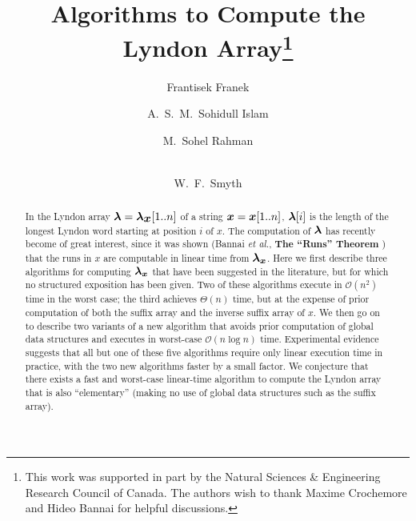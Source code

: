 \documentclass[10pt]{llncs}
\def\s#1{\mbox{\boldmath $#1$}}
\def\O{\mathcal{O}}
\begin{document}
\pagestyle{headings}
\title{Algorithms to Compute the Lyndon Array\thanks
{This work was supported in part by the
Natural Sciences \& Engineering Research Council of Canada.
The authors wish to thank Maxime Crochemore and Hideo Bannai
for helpful discussions.}
}
\author{Frantisek Franek
\and
A.\ S.\ M.\ Sohidull Islam
\and M.\ Sohel Rahman
\and \\ 
W.\ F.\ Smyth
}

\maketitle

\begin{abstract}
In the Lyndon array $\s{\s{\lambda}} = \s{\s{\lambda}}_{\s{x}}[1..n]$ of a string $\s{x} = \s{x}[1..n]$,
$\s{\lambda}[i]$ is the length of the longest Lyndon word starting at
position $i$ of \s{x}.
The computation of $\s{\lambda}$ has recently become of
great interest, since it was shown
(Bannai {\it et al.}, {\bf The ``Runs'' Theorem} \cite{BIINTT14})
that the runs in \s{x} are computable in linear time
from $\s{\lambda_x}$.
Here we first describe three algorithms for computing $\s{\lambda_x}$
that have been suggested in the literature,
but for which no structured exposition has been given.
Two of these algorithms execute in $\O(n^2)$ time in the worst case;
the third achieves $\Theta(n)$ time,
but at the expense of prior computation of both the suffix array
and the inverse suffix array of \s{x}.
We then go on to describe two variants of a new algorithm that
avoids prior computation of global data structures
and executes in worst-case $\O(n\log n)$ time.
Experimental evidence suggests that all but one of these five
algorithms require only linear execution time in practice,
with the two new algorithms faster by a small factor.
We conjecture that there exists a fast
and worst-case linear-time algorithm to compute the Lyndon array
that is also ``elementary''
(making no use of global data structures such as the suffix array).
\end{abstract}
\end{document}

